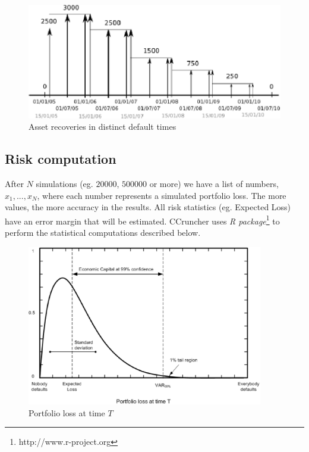\documentclass[a4paper,12pt,final]{article}
\begin{document}
\begin{figure}[!hbtp]
\begin{center}
\includegraphics[width=12cm, angle=0]{./images/recoverymapping.eps}
\caption{Asset recoveries in distinct default times}
\label{recoverymapping}
\end{center}
\end{figure}
\FloatBarrier

\subsection{Risk computation}
After $N$ simulations (eg. $20000$, $500000$ or more) we have a list
of numbers, ${x_1, ..., x_N}$, where each number represents a simulated portfolio 
loss. The more values, the more accuracy in the results. All risk statistics (eg. 
Expected Loss) have an error margin that will be estimated. CCruncher uses 
\emph{R package}\footnote{http://www.r-project.org} to perform the statistical
computations described below.
\newline

\begin{figure}[!hbt]
\begin{center}
\includegraphics[height=7cm, angle=0]{./images/creditvar.eps}
\caption{Portfolio loss at time $T$}
\label{creditvar}
\end{center}
\end{figure}
\FloatBarrier
\end{document}

